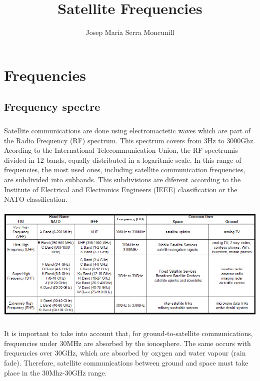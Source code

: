 \documentclass[12pt,a4paper]{report}
\author{Josep Maria Serra Moncunill}
\title{Satellite Frequencies}
\begin{document}
\maketitle

\chapter{Frequencies}

\section{Frequency spectre}
\paragraph{}Satellite communications are done using electromactetic waves which are part of the Radio Frequency (RF) spectrum. This spectrum covers from 3Hz to 3000Ghz. Acording to the International Telecommunication Union, the RF spectrumis divided in 12 bands, equally distributed in a logaritmic scale. In this range of frequencies, the most used ones, including satellite communication frequencies, are subdivided into subbands. This subdivisions are diferent according to the Institute of Electrical and Electronics Engineers (IEEE) classification or the NATO classification.\\
\\
\includegraphics[scale=0.75]{spectrum.png}

\paragraph{}It is important to take into account that, for ground-to-satellite communications, frequencies under 30MHz are absorbed by the ionosphere. The same occurs with frequencies over 30GHz, which are absorbed by oxygen and water vapour (rain fade). Therefore, satellite communications between ground and space must take place in the 30Mhz-30GHz range.
\end{document}
